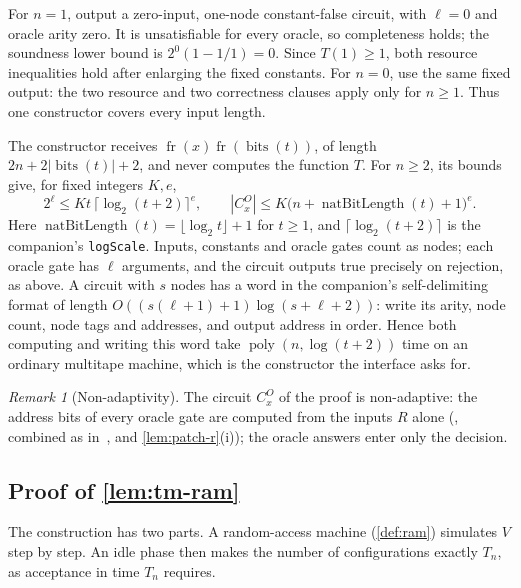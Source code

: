 \documentclass[11pt,letterpaper]{article}
\theoremstyle{definition}
\theoremstyle{remark}
\newtheorem{remark}[theorem]{Remark}
\newcommand{\poly}{\operatorname{poly}}
\newcommand{\abs}[1]{\left|#1\right|}
\begin{document}
For \(n=1\), output a zero-input, one-node constant-false circuit,
with \(\ell=0\) and oracle arity zero. It is unsatisfiable for every
oracle, so completeness holds; the soundness lower bound is
\(2^0(1-1/1)=0\). Since \(T(1)\ge1\), both resource inequalities hold
after enlarging the fixed constants. For \(n=0\), use the same fixed
output: the two resource and two correctness clauses apply only for
\(n\ge1\). Thus one constructor covers every input length.

The constructor receives
\(\operatorname{fr}(x)\operatorname{fr}(\operatorname{bits}(t))\), of
length \(2n+2\abs{\operatorname{bits}(t)}+2\), and never computes the
function \(T\). For \(n\ge2\), its bounds give, for fixed integers
\(K,e\),
\[
 2^\ell\le Kt\,\lceil\log_2(t+2)\rceil^e,
 \qquad
 \abs{C_x^O}\le K\bigl(n+\operatorname{natBitLength}(t)+1\bigr)^e.
\]
Here \(\operatorname{natBitLength}(t)=\lfloor\log_2t\rfloor+1\) for
\(t\ge1\), and \(\lceil\log_2(t+2)\rceil\) is the companion's
\texttt{logScale}. Inputs, constants and oracle gates count as nodes;
each oracle gate has \(\ell\) arguments, and the circuit outputs true
precisely on rejection, as above. A circuit with \(s\) nodes has a word
in the companion's self-delimiting format of length
\(O((s(\ell+1)+1)\log(s+\ell+2))\): write its arity, node count, node
tags and addresses, and output address in order. Hence both computing
and writing this word take \(\poly(n,\log(t+2))\) time on an ordinary
multitape machine, which is the constructor the interface asks for.

\begin{remark}[Non-adaptivity]\label{rem:short-pcp-nonadaptive}
The circuit \(C^O_x\) of the proof is non-adaptive: the address bits of
every oracle gate are computed from the inputs \(R\) alone
(\cite[Lemmas~12.16--12.20]{BCGT13}, combined as
in~\cite[Lemma~12.23]{BCGT13}, and \cref{lem:patch-r}(i)); the oracle
answers enter only the decision.
\end{remark}

\subsection{Proof of \texorpdfstring{\cref{lem:tm-ram}}{the random-access simulation}}

The construction has two parts. A random-access machine
(\cref{def:ram}) simulates \(V\) step by step. An idle phase then makes
the number of configurations exactly \(T_n\), as acceptance in time
\(T_n\) requires.
\end{document}

